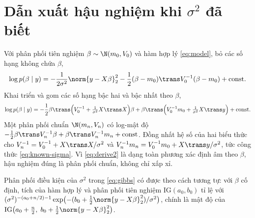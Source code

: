 \documentclass[12pt,a4paper]{report}
\begin{document}
\appendix

\chapter{Dẫn xuất hậu nghiệm khi $\sigma^2$ đã biết}
\label{sec:derivation}

Với phân phối tiên nghiệm $\beta \sim \N(m_0, V_0)$ và hàm hợp lý \eqref{eq:model}, bỏ các số hạng
không chứa $\beta$,
%
\begin{equation}
  \label{eq:derive1}
  \log p(\beta \mid y)
  = -\frac{1}{2\sigma^2} \norm{y - X\beta}_2^2
    - \frac{1}{2} (\beta - m_0)\trans V_0^{-1} (\beta - m_0) + \text{const}.
\end{equation}
%
Khai triển và gom các số hạng bậc hai và bậc nhất theo $\beta$,
%
\begin{equation}
  \label{eq:derive2}
  \log p(\beta \mid y)
  = -\frac{1}{2} \beta\trans \Bigl( V_0^{-1} + \tfrac{1}{\sigma^2} X\trans X \Bigr) \beta
    + \beta\trans \Bigl( V_0^{-1} m_0 + \tfrac{1}{\sigma^2} X\trans y \Bigr)
    + \text{const}.
\end{equation}
%
Một phân phối chuẩn $\N(m_n, V_n)$ có log-mật độ
$-\tfrac{1}{2}\beta\trans V_n^{-1}\beta + \beta\trans V_n^{-1} m_n + \text{const}$.
Đồng nhất hệ số của hai biểu thức cho
$V_n^{-1} = V_0^{-1} + X\trans X/\sigma^2$ và
$V_n^{-1} m_n = V_0^{-1} m_0 + X\trans y/\sigma^2$, tức công thức
\eqref{eq:known-sigma}. Vì \eqref{eq:derive2} là dạng toàn phương xác định âm
theo $\beta$, hậu nghiệm đúng là phân phối chuẩn, không chỉ xấp xỉ.

Phân phối điều kiện của $\sigma^2$ trong \eqref{eq:gibbs} có được theo cách tương
tự: với $\beta$ cố định, tích của hàm hợp lý và phân phối tiên nghiệm $\text{IG}(a_0, b_0)$ tỉ lệ
với $(\sigma^2)^{-(a_0 + n/2) - 1} \exp\bigl(-(b_0 + \tfrac{1}{2}\norm{y - X\beta}_2^2)/\sigma^2\bigr)$,
chính là mật độ của $\text{IG}\bigl(a_0 + \tfrac{n}{2},\; b_0 + \tfrac{1}{2}\norm{y - X\beta}_2^2\bigr)$.

\newpage

\printbibliography[heading=bibintoc,title={Tài liệu tham khảo}]
\end{document}
